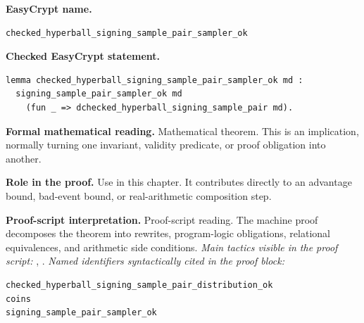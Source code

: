 \begin{formaltheorem}
\noindent\textbf{EasyCrypt name.}
\begin{lstlisting}[language=EasyCrypt,basicstyle=\ttfamily\scriptsize]
checked_hyperball_signing_sample_pair_sampler_ok
\end{lstlisting}
\noindent\textbf{Checked EasyCrypt statement.}
\begin{lstlisting}[language=EasyCrypt,basicstyle=\ttfamily\scriptsize]
lemma checked_hyperball_signing_sample_pair_sampler_ok md :
  signing_sample_pair_sampler_ok md
    (fun _ => dchecked_hyperball_signing_sample_pair md).
\end{lstlisting}
\noindent\textbf{Formal mathematical reading.}
Mathematical theorem. This is an implication, normally turning one invariant, validity predicate, or proof obligation into another.

\noindent\textbf{Role in the proof.}
Use in this chapter. It contributes directly to an advantage bound, bad-event bound, or real-arithmetic composition step.

\noindent\textbf{Proof-script interpretation.}
Proof-script reading. The machine proof decomposes the theorem into rewrites, program-logic obligations, relational equivalences, and arithmetic side conditions.
\emph{Main tactics visible in the proof script:} , .
\emph{Named identifiers syntactically cited in the proof block:}
\begin{lstlisting}[language=EasyCrypt,basicstyle=\ttfamily\scriptsize]
checked_hyperball_signing_sample_pair_distribution_ok
coins
signing_sample_pair_sampler_ok
\end{lstlisting}

\end{formaltheorem}

